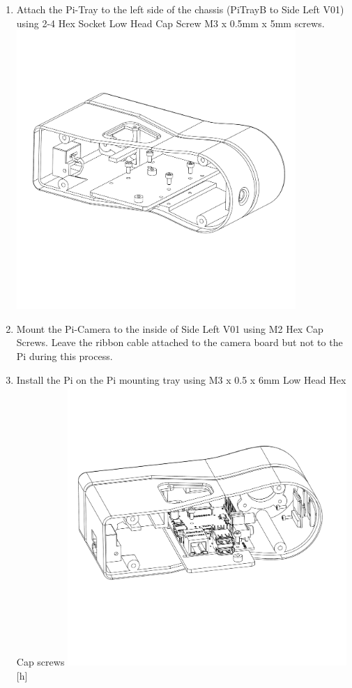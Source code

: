 \documentclass[12pt,titlepage,oneside]{memoir}
\begin{document}
\begin{enumerate}
\item Attach the Pi-Tray to the left side of the chassis (PiTrayB to Side Left V01) using 2-4 Hex Socket Low Head Cap Screw M3 x 0.5mm x 5mm screws.\\
\includegraphics[width=400px]{assem/step1.PDF}
\item Mount the Pi-Camera to the inside of Side Left V01 using M2 Hex Cap Screws. Leave the ribbon cable attached to the camera board but not to the Pi during this process.
\item Install the Pi on the Pi mounting tray using M3 x 0.5 x 6mm Low Head Hex Cap screws
\includegraphics[width=400px]{assem/step2.PDF}[h]

\end{enumerate}
\end{document}
